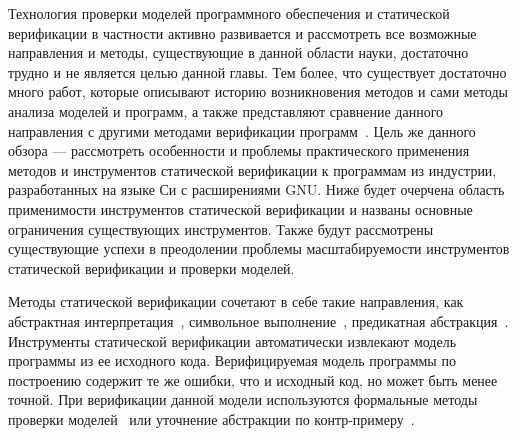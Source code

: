 \documentclass[%
candidate,     %
href,        %
colorlinks,  %
]{disser}
\begin{document}
\actualitysection
\actualitytext

\objectivesection
\objectivetext

\noveltysection
\noveltytext

{}



\pubsection
\pubtext


\structsection
\structtext



Технология проверки моделей программного обеспечения и статической верификации в частности активно развивается и рассмотреть все возможные направления и методы, существующие в данной области науки, достаточно трудно и не является целью данной главы.
Тем более, что существует достаточно много работ, которые описывают историю возникновения методов и сами методы анализа моделей и программ, а также представляют сравнение данного направления с другими методами верификации программ~\cite{Vorobyov2010ComparingMC, DSilva:2008:SAT, Clarke:2008:BMC, HandbookMC}.
Цель же данного обзора --- рассмотреть особенности и проблемы практического применения методов и инструментов статической верификации к программам из индустрии, разработанных на языке Си с расширениями GNU.
Ниже будет очерчена область применимости инструментов статической верификации и названы основные ограничения существующих инструментов.
Также будут рассмотрены существующие успехи в преодолении проблемы масштабируемости инструментов статической верификации и проверки моделей.

Методы статической верификации сочетают в себе такие направления, как абстрактная интерпретация~\cite{Cousot:1977:AIU}, символьное выполнение~\cite{Boyer:1975:SFS}, предикатная абстракция~\cite{Graf:1997:CAS}. 
Инструменты статической верификации автоматически извлекают модель программы из ее исходного кода. Верифицируемая модель программы по построению содержит те же ошибки, что и исходный код, но может быть менее точной. 
При верификации данной модели используются формальные методы проверки моделей~\cite{Biere03boundedmodel} или уточнение абстракции по контр-примеру~\cite{Clarke:2003:CAR}.
\end{document}
